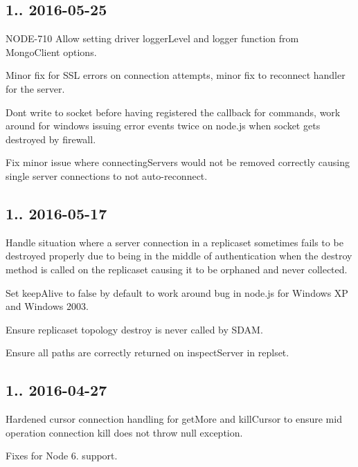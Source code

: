 \subsection*{1.. 2016-\/05-\/25 }


\begin{DoxyItemize}
\item N\+O\+D\+E-\/710 Allow setting driver logger\+Level and logger function from Mongo\+Client options.
\item Minor fix for S\+SL errors on connection attempts, minor fix to reconnect handler for the server.
\item Don\textquotesingle{}t write to socket before having registered the callback for commands, work around for windows issuing error events twice on node.\+js when socket gets destroyed by firewall.
\item Fix minor issue where connecting\+Servers would not be removed correctly causing single server connections to not auto-\/reconnect.
\end{DoxyItemize}

\subsection*{1.. 2016-\/05-\/17 }


\begin{DoxyItemize}
\item Handle situation where a server connection in a replicaset sometimes fails to be destroyed properly due to being in the middle of authentication when the destroy method is called on the replicaset causing it to be orphaned and never collected.
\item Set keep\+Alive to false by default to work around bug in node.\+js for Windows XP and Windows 2003.
\item Ensure replicaset topology destroy is never called by S\+D\+AM.
\item Ensure all paths are correctly returned on inspect\+Server in replset.
\end{DoxyItemize}

\subsection*{1.. 2016-\/04-\/27 }


\begin{DoxyItemize}
\item Hardened cursor connection handling for get\+More and kill\+Cursor to ensure mid operation connection kill does not throw null exception.
\item Fixes for Node 6. support.
\end{DoxyItemize}

